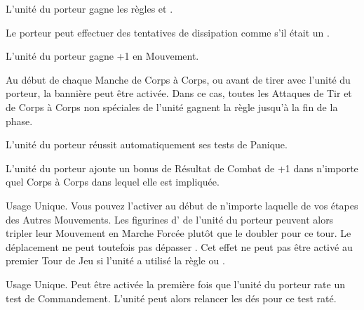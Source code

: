 L'unité du porteur gagne les règles \swiftstride{} et \strider{}.

Le porteur peut effectuer des tentatives de dissipation comme s'il était un \wizardmaster{}.

L'unité du porteur gagne +1 en Mouvement.

Au début de chaque Manche de Corps à Corps, ou avant de tirer avec l'unité du porteur, la bannière peut être activée. Dans ce cas, toutes les Attaques de Tir et de Corps à Corps non spéciales de l'unité gagnent la règle \flamingattacks{} jusqu'à la fin de la phase.

L'unité du porteur réussit automatiquement ses tests de Panique.

\columnbreak

L'unité du porteur ajoute un bonus de Résultat de Combat de +1 dans n'importe quel Corps à Corps dans lequel elle est impliquée.

Usage Unique. Vous pouvez l'activer au début de n'importe laquelle de vos étapes des Autres Mouvements. Les figurines d'\infantry{} de l'unité du porteur peuvent alors tripler leur Mouvement en Marche Forcée plutôt que le doubler pour ce tour. Le déplacement ne peut toutefois pas dépasser . Cet effet ne peut pas être activé au premier Tour de Jeu si l'unité a utilisé la règle \vanguard{} ou \scout{}.

Usage Unique. Peut être activée la première fois que l'unité du porteur rate un test de Commandement. L'unité peut alors relancer les dés pour ce test raté.

\endpricelist
